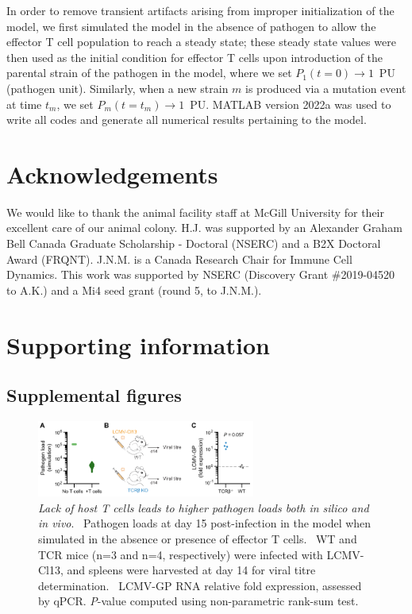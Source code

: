 In order to remove transient artifacts arising from improper initialization of the model, we first simulated the model in the absence of pathogen to allow the effector T cell population to reach a steady state; these steady state values were then used as the initial condition for effector T cells upon introduction of the parental strain of the pathogen in the model, where we set $P_1(t=0) \rightarrow 1$~PU (pathogen unit). Similarly, when a new strain $m$ is produced via a mutation event at time $t_m$, we set $P_m(t=t_m) \rightarrow 1$~PU. MATLAB version 2022a was used to write all codes and generate all numerical results pertaining to the model.

\section{Acknowledgements}

We would like to thank the animal facility staff at McGill University for their excellent care of our animal colony. H.J. was supported by an Alexander Graham Bell Canada Graduate Scholarship - Doctoral (NSERC) and a B2X Doctoral Award (FRQNT). J.N.M. is a Canada Research Chair for Immune Cell Dynamics. This work was supported by NSERC (Discovery Grant \#2019-04520 to A.K.) and a Mi4 seed grant (round 5, to J.N.M.).

\clearpage

\section{Supporting information}

\subsection{Supplemental figures}

\renewcommand{\thefigure}{S\thechapter.\arabic{figure}}
\renewcommand{\figurename}{Figure}
\setcounter{figure}{0}

\begin{figure}[h]
    \centering
    \includegraphics[width=0.64\textwidth]{Figures/VE/figS1_WTvsTCRb.pdf}
    \caption[Lack of host T cells leads to higher pathogen loads both \textit{in silico} and \textit{in vivo}]{\textit{Lack of host T cells leads to higher pathogen loads both \textup{in silico} and \textup{in vivo}}. %
    ~Pathogen loads at day 15 post-infection in the model when simulated in the absence or presence of effector T cells. %
    ~WT and TCR\textbeta{}\KO{} mice (n=3 and n=4, respectively) were infected with LCMV-Cl13, and spleens were harvested at day 14 for viral titre determination. %
    ~LCMV-GP RNA relative fold expression, assessed by qPCR. \textit{P}-value computed using non-parametric rank-sum test.}
    \label{fig:VE_supp_noTcells}
\end{figure}

